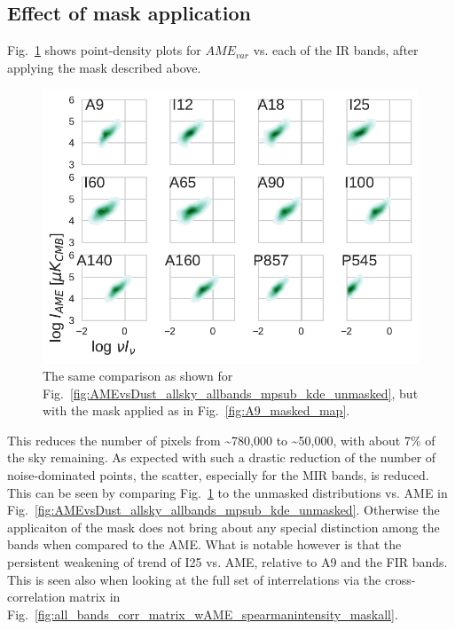         \subsection{Effect of mask application}
            Fig.~\ref{fig:AMEvsDust_allsky_allbands_mpsub_kde_masked} shows point-density plots for $AME_{var}$ vs. each of the IR bands, after applying the mask described above.
               \begin{figure}
                 \includegraphics[width=\textwidth]{../Plots/ch_allsky/AMEvsDust_allsky_allbands_mpsub_kde_masked.pdf}
                 \centering
                 \caption{The same comparison as shown for Fig.~\ref{fig:AMEvsDust_allsky_allbands_mpsub_kde_unmasked}, but with the mask applied as in Fig.~\ref{fig:A9_masked_map}.}
                 \label{fig:AMEvsDust_allsky_allbands_mpsub_kde_masked}
               \end{figure}
            This reduces the number of pixels from \textasciitilde{}780,000 to \textasciitilde{}50,000, with about 7\% of the sky remaining. As expected with such a drastic reduction of the number of noise-dominated points, the scatter, especially for the MIR bands, is reduced. This can be seen by comparing Fig.~\ref{fig:AMEvsDust_allsky_allbands_mpsub_kde_masked} to the unmasked distributions vs. AME in Fig.~\ref{fig:AMEvsDust_allsky_allbands_mpsub_kde_unmasked}. Otherwise the applicaiton of the mask does not bring about any special distinction among the bands when compared to the AME. What is notable however is that the persistent weakening of trend of I25 vs. AME, relative to A9 and the FIR bands. This is seen also when looking at the full set of interrelations via the cross-correlation matrix in Fig.~\ref{fig:all_bands_corr_matrix_wAME_spearmanintensity_maskall}.

